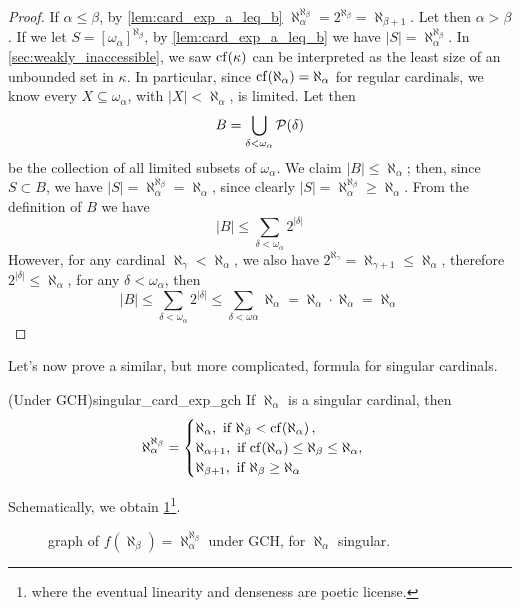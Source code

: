\begin{proof}
    If $\alpha\leq\beta$, by \cref{lem:card_exp_a_leq_b} $\aleph_\alpha^{\aleph_\beta}=2^{\aleph_\beta}=\aleph_{\beta+1}$. Let then $\alpha>\beta$. If we let $S=[\omega_\alpha]^{\aleph_\beta}$, by \cref{lem:card_exp_a_leq_b} we have $|S|=\aleph_\alpha^{\aleph_\beta}$. In \cref{sec:weakly_inaccessible}, we saw $\mathrm{cf}\!\left(\kappa\right)$ can be interpreted as the least size of an unbounded set in $\kappa$. In particular, since $\mathrm{cf}\!\left(\aleph_\alpha\right)=\aleph_\alpha$ for regular cardinals, we know every $X\subseteq\omega_\alpha$, with $|X|<\aleph_\alpha$, is limited. Let then
    $$B=\bigcup_{\delta<\omega_\alpha}\mathcal{P}(\delta)$$
    be the collection of all limited subsets of $\omega_\alpha$. We claim $|B|\leq\aleph_\alpha$; then, since $S\subset B$, we have $|S|=\aleph_\alpha^{\aleph_\beta}=\aleph_\alpha$, since clearly $|S|=\aleph_\alpha^{\aleph_\beta}\geq\aleph_\alpha$. From the definition of $B$ we have
    $$|B|\leq\sum_{\delta<\omega_\alpha}2^{|\delta|}$$
    However, for any cardinal $\aleph_\gamma<\aleph_\alpha$, we also have $2^{\aleph_\gamma}=\aleph_{\gamma+1}\leq\aleph_\alpha$, therefore $2^{|\delta|}\leq\aleph_\alpha$, for any $\delta<\omega_\alpha$, then
    $$|B|\leq\sum_{\delta<\omega_\alpha}2^{|\delta|}\leq\sum_{\delta<\omega\alpha}\aleph_\alpha=\aleph_\alpha\cdot\aleph_\alpha=\aleph_\alpha$$
\end{proof}

Let's now prove a similar, but more complicated, formula for singular cardinals.

\begin{lemma}{(Under GCH)}{singular_card_exp_gch}
    If $\aleph_\alpha$ is a singular cardinal, then
    $$\aleph_\alpha^{\aleph_\beta}=\begin{cases}
        \aleph_\alpha,\text{ if }\aleph_\beta<\mathrm{cf}\!\left(\aleph_\alpha\right),\\
        \aleph_{\alpha+1},\text{ if }\mathrm{cf}\!\left(\aleph_\alpha\right)\leq\aleph_\beta\leq\aleph_\alpha,\\
        \aleph_{\beta+1},\text{ if }\aleph_\beta\geq\aleph_\alpha
    \end{cases}$$
\end{lemma}

Schematically, we obtain \cref{fig:singular_gch}\footnote{where the eventual linearity and denseness are poetic license.}.

\begin{figure}
\centering
{}
\caption{graph of $f(\aleph_\beta)=\aleph_\alpha^{\aleph_\beta}$ under GCH, for $\aleph_\alpha$ singular.}
\label{fig:singular_gch}
\end{figure}

